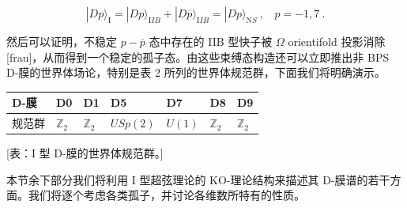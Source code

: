 \documentclass[11pt,a4paper]{ctexart}
\begin{document}
\[|Dp\rangle_{\mathrm I}= |Dp\rangle_{\mathrm IIB} + |D\overline{p}\rangle_{\mathrm IIB}
=|Dp\rangle_{{\mathrm NS}}\ ,\ \ \ \ p=-1,7\ .\]

然后可以证明，不稳定 \(p-\overline{p}\) 态中存在的 IIB 型快子被 \(\Omega\) orientifold 投影消除 [frau]，从而得到一个稳定的孤子态。由这些束缚态构造还可以立即推出非 BPS D-膜的世界体场论，特别是表 2 所列的世界体规范群，下面我们将明确演示。

{\def\LTcaptype{table} %
\begin{longtable}[]{@{}
  >{\raggedright\arraybackslash}p{}
  >{\raggedright\arraybackslash}p{}
  >{\raggedright\arraybackslash}p{}
  >{\raggedright\arraybackslash}p{}
  >{\raggedright\arraybackslash}p{}
  >{\raggedright\arraybackslash}p{}
  >{\raggedright\arraybackslash}p{}@{}}
\toprule\noalign{}
\begin{minipage}[b]{\linewidth}\raggedright
D-膜
\end{minipage} & \begin{minipage}[b]{\linewidth}\raggedright
D0
\end{minipage} & \begin{minipage}[b]{\linewidth}\raggedright
D1
\end{minipage} & \begin{minipage}[b]{\linewidth}\raggedright
D5
\end{minipage} & \begin{minipage}[b]{\linewidth}\raggedright
D7
\end{minipage} & \begin{minipage}[b]{\linewidth}\raggedright
D8
\end{minipage} & \begin{minipage}[b]{\linewidth}\raggedright
D9
\end{minipage} \\
\midrule\noalign{}
\endhead
\bottomrule\noalign{}
\endlastfoot
规范群 & \({\mathbb{Z}}_2\) & \({\mathbb{Z}}_2\) & \(USp(2)\) & \(U(1)\) & \({\mathbb{Z}}_2\) & \({\mathbb{Z}}_2\) \\
\end{longtable}
}

{[}表：I 型 D-膜的世界体规范群。{]}

本节余下部分我们将利用 I 型超弦理论的 KO-理论结构来描述其 D-膜谱的若干方面。我们将逐个考虑各类孤子，并讨论各维数所特有的性质。
\end{document}
